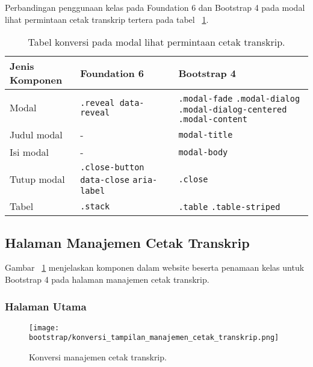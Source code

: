 \noindent Perbandingan penggunaan kelas pada Foundation 6 dan Bootstrap 4 pada modal lihat permintaan cetak transkrip tertera pada tabel ~\ref{table:konversiLihatPermintaanCetakTranskrip}.\\

\begin{table}[H]
	\caption{Tabel konversi pada modal lihat permintaan cetak transkrip.}
	\begin{tabular}{| p{} | p{} | p{} |} 
		\hline
		\textbf{Jenis Komponen} & \textbf{Foundation 6} & \textbf{Bootstrap 4}  \\ [0.5ex] 
		\hline	
		Modal & \texttt{.reveal data-reveal} & \texttt{.modal-fade} \newline \texttt{.modal-dialog} \newline \texttt{.modal-dialog-centered} \newline \texttt{.modal-content} \\
		Judul modal & - & \texttt{modal-title}\\
		\hline
		Isi modal & - & \texttt{modal-body}\\
		\hline
		Tutup modal & \texttt{.close-button} \newline \texttt{data-close} \newline \texttt{aria-label} & \texttt{.close}\\
		\hline	
		Tabel & \texttt{.stack} & \texttt{.table} \newline \texttt{.table-striped} \\[1ex]
		\hline
	\end{tabular}
	\label{table:konversiLihatPermintaanCetakTranskrip}
\end{table}

\subsection{Halaman Manajemen Cetak Transkrip}

\noindent Gambar ~\ref{fig:konversiManajemenCetakTranskrip} menjelaskan komponen dalam website beserta penamaan kelas untuk Bootstrap 4 pada halaman manajemen cetak transkrip.\\
\subsubsection{Halaman Utama}
\begin{figure} [H]
	\centering  
	\texttt{[image: bootstrap/konversi\_tampilan\_manajemen\_cetak\_transkrip.png]}
	\caption{Konversi manajemen cetak transkrip.} 
	\label{fig:konversiManajemenCetakTranskrip}
\end{figure}

